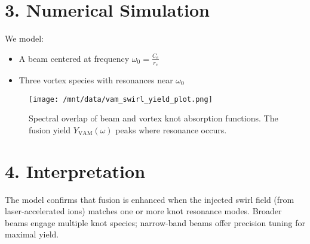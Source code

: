 \documentclass{article}
\begin{document}
\section*{3. Numerical Simulation}


We model:


\begin{itemize}


  \item A beam centered at frequency $\omega_0 = \frac{C_e}{r_c}$


  \item Three vortex species with resonances near $\omega_0$


\end{itemize}






\begin{figure}[h!]


  \centering


  \texttt{[image: /mnt/data/vam\_swirl\_yield\_plot.png]}


  \caption{Spectral overlap of beam and vortex knot absorption functions. The fusion yield $Y_{\mathrm{VAM}}(\omega)$ peaks where resonance occurs.}


\end{figure}






\section*{4. Interpretation}


The model confirms that fusion is enhanced when the injected swirl field (from laser-accelerated ions) matches one or more knot resonance modes. Broader beams engage multiple knot species; narrow-band beams offer precision tuning for maximal yield.
\end{document}
